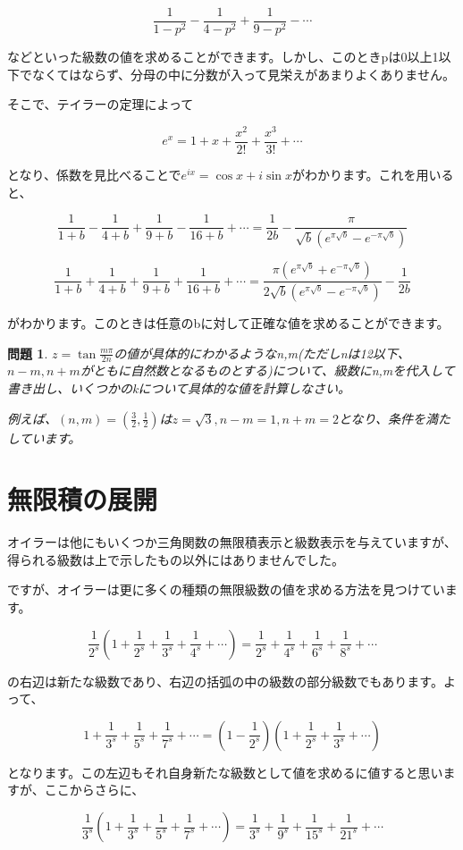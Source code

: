 \documentclass[a4paper]{jsarticle}
\theoremstyle{break}
\newtheorem*{prb}{問題}
\begin{document}
\[\frac{1}{1-p^2}-\frac{1}{4-p^2}+\frac{1}{9-p^2}-\cdots\]

などといった級数の値を求めることができます。しかし、このときpは0以上1以下でなくてはならず、分母の中に分数が入って見栄えがあまりよくありません。

そこで、テイラーの定理によって

\[e^x=1+x+\frac{x^2}{2!}+\frac{x^3}{3!}+\cdots\]

となり、係数を見比べることで$e^{ix}=\cos x+i\sin x$がわかります。これを用いると、

\[\frac{1}{1+b}-\frac{1}{4+b}+\frac{1}{9+b}-\frac{1}{16+b}+\cdots=\frac{1}{2b}-\frac{\pi}{\sqrt{b}(e^{\pi\sqrt{b}}-e^{-\pi\sqrt{b}})}\]

\[\frac{1}{1+b}+\frac{1}{4+b}+\frac{1}{9+b}+\frac{1}{16+b}+\cdots=\frac{\pi(e^{\pi\sqrt{b}}+e^{-\pi\sqrt{b}})}{2\sqrt{b}(e^{\pi\sqrt{b}}-e^{-\pi\sqrt{b}})}-\frac{1}{2b}\]

がわかります。このときは任意のbに対して正確な値を求めることができます。

\begin{prb}
$z=\tan\frac{m\pi}{2n}$の値が具体的にわかるようなn,m(ただしnは12以下、$n-m,n+m$がともに自然数となるものとする)について、級数にn,mを代入して書き出し、いくつかのkについて具体的な値を計算しなさい。

例えば、$(n,m)=(\frac{3}{2},\frac{1}{2})$は$z=\sqrt{3},n-m=1,n+m=2$となり、条件を満たしています。
\end{prb}
\section{無限積の展開}
オイラーは他にもいくつか三角関数の無限積表示と級数表示を与えていますが、得られる級数は上で示したもの以外にはありませんでした。

ですが、オイラーは更に多くの種類の無限級数の値を求める方法を見つけています。

\[\frac{1}{2^s}\left( 1+\frac{1}{2^s}+\frac{1}{3^s}+\frac{1}{4^s}+\cdots \right)=\frac{1}{2^s}+\frac{1}{4^s}+\frac{1}{6^s}+\frac{1}{8^s}+\cdots\]

の右辺は新たな級数であり、右辺の括弧の中の級数の部分級数でもあります。よって、

\[1+\frac{1}{3^s}+\frac{1}{5^s}+\frac{1}{7^s}+\cdots=\left( 1-\frac{1}{2^s} \right)\left( 1+\frac{1}{2^s}+\frac{1}{3^s}+\cdots \right)\]

となります。この左辺もそれ自身新たな級数として値を求めるに値すると思いますが、ここからさらに、

\[\frac{1}{3^s}\left( 1+\frac{1}{3^s}+\frac{1}{5^s}+\frac{1}{7^s}+\cdots \right)=\frac{1}{3^s}+\frac{1}{9^s}+\frac{1}{15^s}+\frac{1}{21^s}+\cdots\]
\end{document}
